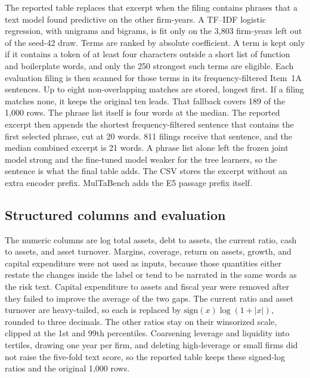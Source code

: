 \documentclass{article}
\begin{document}
The reported table replaces that excerpt when the filing contains phrases that a text model found predictive on the other firm-years.
A TF--IDF logistic regression, with unigrams and bigrams, is fit only on the 3{,}803 firm-years left out of the seed-42 draw.
Terms are ranked by absolute coefficient.
A term is kept only if it contains a token of at least four characters outside a short list of function and boilerplate words, and only the 250 strongest such terms are eligible.
Each evaluation filing is then scanned for those terms in its frequency-filtered Item~1A sentences.
Up to eight non-overlapping matches are stored, longest first.
If a filing matches none, it keeps the original ten leads.
That fallback covers 189 of the 1{,}000 rows.
The phrase list itself is four words at the median.
The reported excerpt then appends the shortest frequency-filtered sentence that contains the first selected phrase, cut at 20 words.
811 filings receive that sentence, and the median combined excerpt is 21 words.
A phrase list alone left the frozen joint model strong and the fine-tuned model weaker for the tree learners, so the sentence is what the final table adds.
The CSV stores the excerpt without an extra encoder prefix.
MulTaBench adds the E5 passage prefix itself.

\subsection{Structured columns and evaluation}

The numeric columns are log total assets, debt to assets, the current ratio, cash to assets, and asset turnover.
Margins, coverage, return on assets, growth, and capital expenditure were not used as inputs, because those quantities either restate the changes inside the label or tend to be narrated in the same words as the risk text.
Capital expenditure to assets and fiscal year were removed after they failed to improve the average of the two gaps.
The current ratio and asset turnover are heavy-tailed, so each is replaced by $\mathrm{sign}(x)\log(1+|x|)$, rounded to three decimals.
The other ratios stay on their winsorized scale, clipped at the 1st and 99th percentiles.
Coarsening leverage and liquidity into tertiles, drawing one year per firm, and deleting high-leverage or small firms did not raise the five-fold text score, so the reported table keeps these signed-log ratios and the original 1{,}000 rows.
\end{document}
